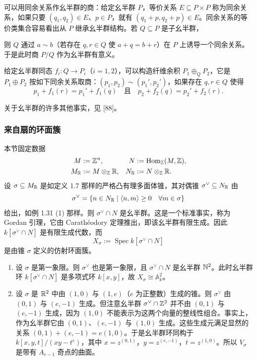 可以用同余关系作幺半群的商：给定幺半群 $P$，等价关系 $E\subseteq P\times P$ 称为同余关系，如果只要 $(q_1,q_2)\in E$、$p\in P$，就有 $(q_1+p,q_2+p)\in E$。同余关系的等价类集合容易看出从 $P$ 继承幺半群结构。若 $Q\subseteq P$ 是子幺半群，

则 $Q$ 通过 $a\sim b$（若存在 $q,r\in Q$ 使 $a+q=b+r$）在 $P$ 上诱导一个同余关系。于是此时商 $P/Q$ 作为幺半群有意义。

给定幺半群同态 $f_i:Q\to P_i$（$i=1,2$），可以构造纤维余积 $P_1\oplus_Q P_2$，它是 $P_1\oplus P_2$ 按如下同余关系取商：$(p_1,p_2)\sim(p_1',p_2')$，如果存在 $q,r\in Q$ 使得
\[
  p_1+f_1(r)=p_1'+f_1(q)\quad\text{且}\quad p_2+f_2(q)=p_2'+f_2(r).
\]

关于幺半群的许多其他事实，见 [88]。

\subsubsection{来自扇的环面簇}

本节固定数据
\[
  \begin{aligned}
    M&:=\mathbb{Z}^n, & N&:=\operatorname{Hom}_{\mathbb{Z}}(M,\mathbb{Z}),\\
    M_{\mathbb{R}}&:=M\otimes_{\mathbb{Z}}\mathbb{R}, & N_{\mathbb{R}}&:=N\otimes_{\mathbb{Z}}\mathbb{R}.
  \end{aligned}
\]
设 $\sigma\subseteq M_{\mathbb{R}}$ 是如定义 1.7 那样的严格凸有理多面体锥，其对偶锥 $\sigma^{\vee}\subseteq N_{\mathbb{R}}$ 由
\[
  \sigma^{\vee}=\{n\in N_{\mathbb{R}}\mid \langle n,m\rangle\ge 0\quad \forall m\in\sigma\}
\]
给出，如例 1.31 (1) 那样。则 $\sigma^{\vee}\cap N$ 是幺半群。这是一个标准事实，称为 Gordan 引理，它由 Carathéodory 定理推出，即该幺半群有限生成。因此 $k[\sigma^{\vee}\cap N]$ 是有限生成代数，而
\[
  X_\sigma:=\operatorname{Spec}k[\sigma^{\vee}\cap N]
\]
是由锥 $\sigma$ 定义的仿射环面簇。

\begin{examples}
\begin{enumerate}[label=(\arabic*),leftmargin=*]
\item 设 $\sigma$ 是第一象限。则 $\sigma^{\vee}$ 也是第一象限，且 $\sigma^{\vee}\cap N$ 是幺半群 $\mathbb{N}^2$。此时幺半群环 $k[\sigma^{\vee}\cap N]$ 是多项式环 $k[x,y]$，故 $X_\sigma\cong\mathbb{A}^2_k$。
\item 设 $\sigma$ 是 $\mathbb{R}^2$ 中由 $(1,0)$ 与 $(1,e)$（$e$ 为正整数）生成的锥。则 $\sigma^{\vee}$ 由 $(0,1)$ 与 $(e,-1)$ 生成。但注意幺半群 $\sigma^{\vee}\cap\mathbb{Z}^2$ 并不由 $(0,1)$ 与 $(e,-1)$ 生成，因为 $(1,0)$ 不能表示为这两个向量的整线性组合。事实上，作为幺半群它由 $(0,1)$、$(e,-1)$ 与 $(1,0)$ 生成。这些生成元满足显然的关系 $(0,1)+(e,-1)=e(1,0)$。于是幺半群环同构于 $k[x,y,t]/(xy-t^e)$，其中 $x=z^{(0,1)}$，$y=z^{(e,-1)}$，$t=z^{(1,0)}$。所以 $V_\sigma$ 是带有 $A_{e-1}$ 奇点的曲面。
\end{enumerate}
\end{examples}

